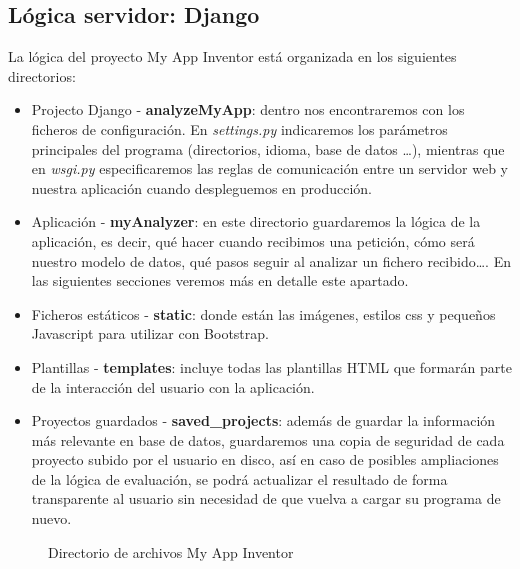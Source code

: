 \documentclass[a4paper, 12pt]{book}
\begin{document}
\subsection{Lógica servidor: Django}
La lógica del proyecto My App Inventor está organizada en los siguientes directorios:
\begin{itemize}
	\item Projecto Django - \textbf{analyzeMyApp}: dentro nos encontraremos con los ficheros de configuración. En \textit{settings.py} indicaremos los parámetros principales del programa (directorios, idioma, base de datos \ldots), mientras que en \textit{wsgi.py} especificaremos las reglas de comunicación entre un servidor web y nuestra aplicación cuando despleguemos en producción. 
	\item Aplicación - \textbf{myAnalyzer}: en este directorio guardaremos la lógica de la aplicación, es decir, qué hacer cuando recibimos una petición, cómo será nuestro modelo de datos, qué pasos seguir al analizar un fichero recibido\ldots. En las siguientes secciones veremos más en detalle este apartado.
	\item Ficheros estáticos - \textbf{static}: donde están las imágenes, estilos css y pequeños Javascript para utilizar con Bootstrap.  
	\item Plantillas - \textbf{templates}: incluye todas las plantillas HTML que formarán parte de la interacción del usuario con la aplicación. 
	\item Proyectos guardados - \textbf{saved\_projects}: además de guardar la información más relevante en base de datos, guardaremos una copia de seguridad de cada proyecto subido por el usuario en disco, así en caso de posibles ampliaciones de la lógica de evaluación, se podrá actualizar el resultado de forma transparente al usuario sin necesidad de que vuelva a cargar su programa de nuevo. 
\end{itemize}  
\begin{figure}[H]
  \caption{Directorio de archivos My App Inventor}
  \label{fig:dirarchivos}
\end{figure}
\end{document}
